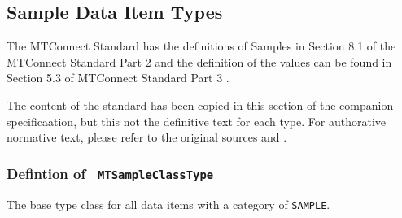 \FloatBarrier
\subsection{Sample Data Item Types} \label{model:SampleDataItemTypes}

The MTConnect Standard has the definitions of Samples in 
Section 8.1 of the MTConnect Standard Part 2 \cite{MTCPart2} and the 
definition of the values can be found in Section 5.3 of MTConnect Standard Part 3 \cite{MTCPart3}. 

The content of the standard has been copied in this section of the companion specificaation,
but this not the definitive text for each type. For authorative normative text, please refer 
to the original sources \cite{MTCPart2} and \cite{MTCPart3}.

\subsubsection{Defintion of \texttt{ MTSampleClassType}}
  \label{type:MTSampleClassType}

\FloatBarrier

The base type class for all data items with a category of \texttt{SAMPLE}.


